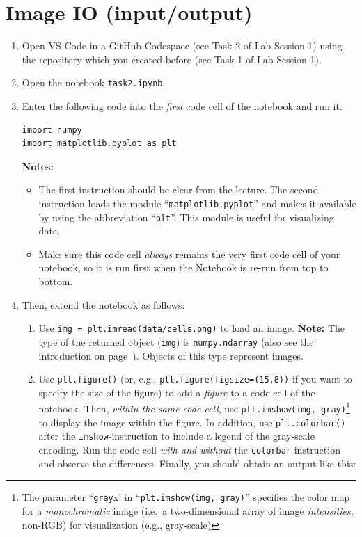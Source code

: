 \documentclass[12pt,a4paper]{article}
\begin{document}
\section{Image IO (input/output)}
\label{task:io}
\begin{enumerate}
    \item Open VS Code in a GitHub Codespace (see Task 2 of Lab Session 1) using the repository which you created before (see Task 1 of Lab Session 1).
    \item Open the notebook \texttt{task2.ipynb}.
    \item Enter the following code into the \emph{first} code cell of the notebook and run it:
\begin{Verbatim}[frame=single]
import numpy
import matplotlib.pyplot as plt
\end{Verbatim}
    \textbf{Notes:}
    \begin{itemize}
        \item The first instruction should be clear from the lecture. The second instruction loads the module ``\texttt{matplotlib.pyplot}'' and makes it available by using the abbreviation ``\texttt{plt}''. This module is useful for visualizing data.
        \item Make sure this code cell \emph{always} remains the very first code cell of your notebook, so it is run first when the Notebook is re-run from top to bottom.
    \end{itemize}
    \item Then, extend the notebook as follows:
    \begin{enumerate}
        \item Use \texttt{img = plt.imread(\textquotesingle{}data/cells.png\textquotesingle)} to load an image. \textbf{Note:} The type of the returned object (\texttt{img}) is \texttt{numpy.ndarray} (also see the introduction on page~\pageref{sec:ndarray}). Objects of this type represent images.
        \item Use \texttt{plt.figure()} (or, e.g., \texttt{plt.figure(figsize=(15,8))} if you want to specify the size of the figure) to add a \emph{figure} to a code cell of the notebook. Then, \emph{within the same code cell}, use \texttt{plt.imshow(img, \textquotesingle{}gray\textquotesingle)}\footnote{The parameter ``\texttt{\textquotesingle{}gray\textquotesingle}x' in ``\texttt{plt.imshow(img, \textquotesingle{}gray\textquotesingle)}'' specifies the color map for a \emph{monochromatic} image (i.e.\ a two-dimensional array of image \emph{intensities}, non-RGB) for visualization (e.g., gray-scale)} to display the image within the figure. In addition, use \texttt{plt.colorbar()} after the \texttt{imshow}-instruction to include a legend of the gray-scale encoding. Run the code cell \emph{with and without} the \texttt{colorbar}-instruction and observe the differences. Finally, you should obtain an output like this:

\end{enumerate}
\end{enumerate}
\end{document}
